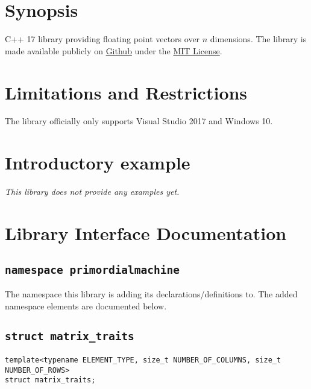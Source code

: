 \documentclass[oneside]{book}
\begin{document}
\frontmatter

\begin{titlepage}
\maketitle
\end{titlepage}

\tableofcontents
{}

\mainmatter

\chapter{Synopsis}
C++ 17 library providing floating point vectors over $n$ dimensions.
The library is made available publicly on
\href{\GetLibraryRepository}{Github}
under the
\href{\GetLibraryRepository/blob/master/LICENSE}{MIT License}.

\chapter{Limitations and Restrictions}
The library officially only supports Visual Studio 2017 and Windows 10.

\chapter{Introductory example}
\textit{\color{orange}This library does not provide any examples yet.}



\chapter{Library Interface Documentation}

\section{\texttt{namespace primordialmachine}}
The namespace this library is adding its declarations/definitions to.
The added namespace elements are documented below.




\section{\texttt{struct matrix\_traits}}
\begin{verbatim}
template<typename ELEMENT_TYPE, size_t NUMBER_OF_COLUMNS, size_t NUMBER_OF_ROWS>
struct matrix_traits;
\end{verbatim}
\end{document}
